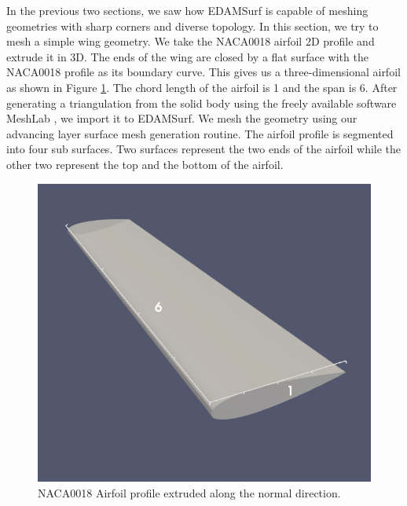 In the previous two sections, we saw how EDAMSurf is capable of meshing geometries with sharp corners and diverse topology. In this section, we try to mesh a simple wing geometry. We take the NACA0018 airfoil 2D profile and extrude it in 3D. The ends of the wing are closed by a flat surface with the NACA0018 profile as its boundary curve. This gives us a three-dimensional airfoil as shown in Figure \ref{fig-naca0018}. The chord length of the airfoil is 1 and the span is 6. After generating a triangulation from the solid body using the freely available software MeshLab \cite{LocalChapterEvents:ItalChap:ItalianChapConf2008:129-136}, we import it to EDAMSurf. We mesh the geometry using our advancing layer surface mesh generation routine. The airfoil profile is segmented into four sub surfaces. Two surfaces represent the two ends of the airfoil while the other two represent the top and the bottom of the airfoil.



\begin{figure}
	\centering
	\includegraphics[width=0.6\linewidth]{img/r/naca0018.png}
	\caption{NACA0018 Airfoil profile extruded along the normal direction.}
	\label{fig-naca0018}
\end{figure}

